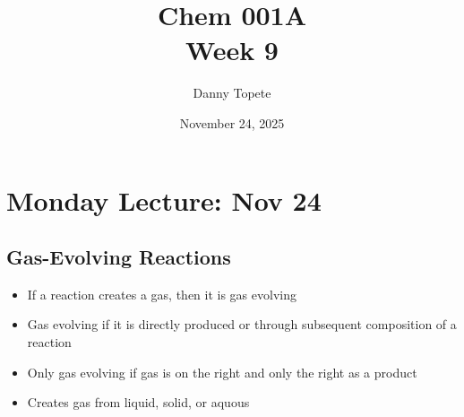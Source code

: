\documentclass{article}
\title{Chem 001A\\ Week 9}
\author{Danny Topete}
\date{November 24, 2025}
\begin{document}
\maketitle{}

\section{Monday Lecture: Nov 24}
\subsection{Gas-Evolving Reactions}
\begin{itemize}
  \item If a reaction creates a gas, then it is gas evolving
  \item Gas evolving if it is directly produced or through subsequent composition
    of a reaction
  \item Only gas evolving if gas is on the right and only the right as a product
  \item Creates gas from liquid, solid, or aquous
\end{itemize}
\end{document}

